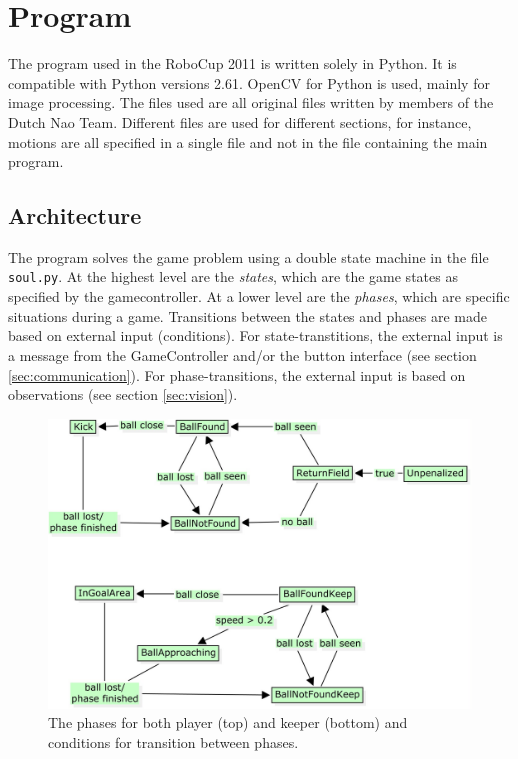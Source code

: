 \documentclass[11pt,a4paper,oneside]{article}
\begin{document}
\section{Program}
The program used in the RoboCup 2011 is written solely in Python. It is compatible with Python versions 2.61. OpenCV for Python is used, mainly for image processing. The files used are all original files written by members of the Dutch Nao Team. Different files are used for different sections, for instance, motions are all specified in a single file and not in the file containing the main program.
\subsection{Architecture}
\label{sec:architecture}
The program solves the game problem using a double state machine in the file \texttt{soul.py}. At the highest level are the \textit{states}, which are the game states as specified by the gamecontroller. 
At a lower level are the \textit{phases}, which are specific situations during a game. Transitions between the states and phases are made based on external input (conditions). 
For state-transtitions, the external input is a message from the GameController and/or the button interface (see section \ref{sec:communication}). 
For phase-transitions, the external input is based on observations (see section \ref{sec:vision}). 


\begin{figure}
\centering
\includegraphics[width=12cm]{Conceptmaps.jpg}
\caption{The phases for both player (top) and keeper (bottom) and conditions for transition between phases.}
\label{fig:phases}
\end{figure}
\end{document}
